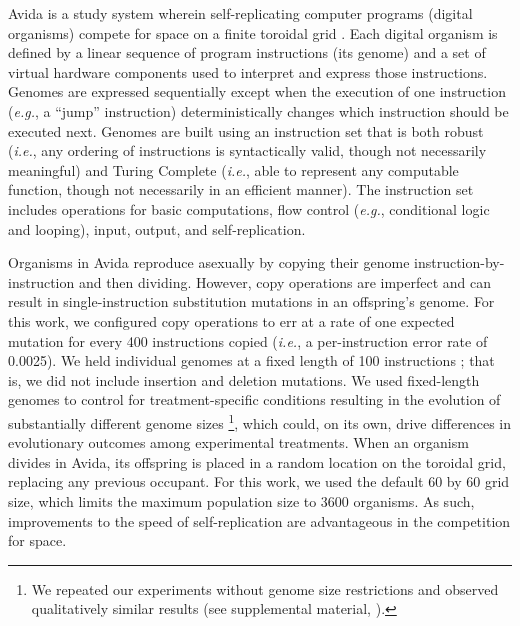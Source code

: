\documentclass[utf8]{frontiersSCNS} %
\providecommand{\DIFaddtex}[1]{{\protect\color{blue}\uwave{#1}}} %
\providecommand{\DIFaddbegin}{} %
\providecommand{\DIFaddend}{} %
\providecommand{\DIFadd}[1]{\texorpdfstring{\DIFaddtex{#1}}{#1}} %
\newcommand{\DIFaddincludegraphics}[2][]{{\color{blue}\fbox{\DIFOincludegraphics[#1]{#2}}}} %
\DeclareRobustCommand{\DIFaddbegin}{\DIFOaddbegin \let\includegraphics\DIFaddincludegraphics} %
\DeclareRobustCommand{\DIFaddend}{\DIFOaddend \let\includegraphics\DIFOincludegraphics} %
\begin{document}
\begin{raggedbottom}
Avida is a study system wherein self-replicating computer programs (digital organisms) compete for space on a finite toroidal grid \citep{ofria_avida:_2009}.
Each digital organism is defined by a linear sequence of program instructions (its genome) and a set of virtual hardware components used to interpret and express those instructions.
Genomes are expressed sequentially except when the execution of one instruction (\textit{e.g.}, a ``jump'' instruction) deterministically changes which instruction should be executed next.
Genomes are built using an instruction set that is both robust (\textit{i.e.}, any ordering of instructions is syntactically valid, though not necessarily meaningful) and Turing Complete (\textit{i.e.}, able to represent any computable function, though not necessarily in an efficient manner).
The instruction set includes operations for basic computations, flow control (\textit{e.g.}, conditional logic and looping), input, output, and self-replication.

Organisms in Avida reproduce asexually by copying their genome instruction-by-instruction and then dividing.
However, copy operations are imperfect and can result in single-instruction substitution mutations in an offspring's genome.
For this work, we configured copy operations to err at a rate of one expected mutation for every 400 instructions copied (\textit{i.e.}, a per-instruction error rate of 0.0025).
We held individual genomes at a fixed length of 100 instructions \DIFaddbegin \DIFadd{(the default genome size in Avida)}\DIFaddend ; that is, we did not include insertion and deletion mutations.
We used fixed-length genomes to control for treatment-specific conditions resulting in the evolution of substantially different genome sizes \citep{supplemental_material}\footnote{
We repeated our experiments without genome size restrictions and observed qualitatively similar results (see supplemental material, \citealt{supplemental_material}).
}, which could, on its own, drive differences in evolutionary outcomes among experimental treatments.
When an organism divides in Avida, its offspring is placed in a random location on the toroidal grid, replacing any previous occupant.
For this work, we used the default 60 by 60 grid size, which limits the maximum population size to 3600 organisms.
As such, improvements to the speed of self-replication are advantageous in the competition for space.


\end{raggedbottom}
\end{document}
